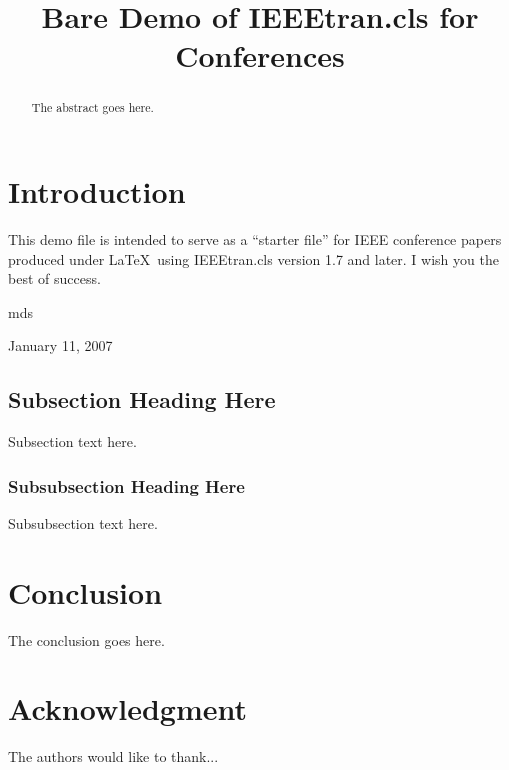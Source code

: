 \documentclass[conference]{IEEEtran}
\begin{document}
%
\title{Bare Demo of IEEEtran.cls for Conferences}

\author{
}

\maketitle


\begin{abstract}
The abstract goes here.
\end{abstract}

\section{Introduction}
This demo file is intended to serve as a ``starter file''
for IEEE conference papers produced under \LaTeX\ using
IEEEtran.cls version 1.7 and later.
I wish you the best of success.

\hfill mds

\hfill January 11, 2007

\subsection{Subsection Heading Here}
Subsection text here.


\subsubsection{Subsubsection Heading Here}
Subsubsection text here.

\section{Conclusion}
The conclusion goes here.






\section*{Acknowledgment}


The authors would like to thank...




\end{document}
